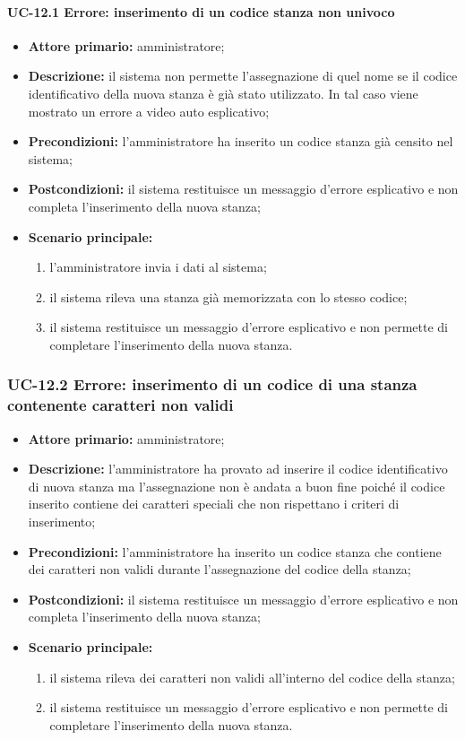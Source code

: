 \paragraph{UC-12.1 Errore: inserimento di un codice stanza non univoco}
\begin{itemize}
	\item \textbf{Attore primario:} amministratore;
	\item \textbf{Descrizione:} il sistema non permette l'assegnazione di quel nome se il codice identificativo della nuova stanza è già stato utilizzato. In tal caso viene mostrato un errore a video auto esplicativo;
	\item \textbf{Precondizioni:} l'amministratore ha inserito un codice stanza già censito nel sistema;
	\item \textbf{Postcondizioni:} il sistema restituisce un messaggio d'errore esplicativo e non completa l'inserimento della nuova stanza;
	\item \textbf{Scenario principale:}
	      \begin{enumerate}
	      	      \item l'amministratore invia i dati al sistema;
		      \item il sistema rileva una stanza già memorizzata con lo stesso codice;
		      \item il sistema restituisce un messaggio d'errore esplicativo e non permette di completare l'inserimento della nuova stanza.
	      \end{enumerate}
\end{itemize}

\subsubsection{UC-12.2 Errore: inserimento di un codice di una stanza contenente caratteri non validi}
\begin{itemize}
	\item \textbf{Attore primario:} amministratore;
	\item \textbf{Descrizione:} l'amministratore ha provato ad inserire il codice identificativo di nuova stanza ma l'assegnazione non è andata a buon fine poiché il codice inserito contiene dei caratteri speciali che non rispettano i criteri di inserimento;
	\item \textbf{Precondizioni:} l'amministratore ha inserito un codice stanza che contiene dei caratteri non validi durante l'assegnazione del codice della stanza;
	\item \textbf{Postcondizioni:} il sistema restituisce un messaggio d'errore esplicativo e non completa l'inserimento della nuova stanza;
	\item \textbf{Scenario principale:}
	      \begin{enumerate}
		      \item il sistema rileva dei caratteri non validi all'interno del codice della stanza;
		      \item il sistema restituisce un messaggio d'errore esplicativo e non permette di completare l'inserimento della nuova stanza.
	      \end{enumerate}
\end{itemize}



